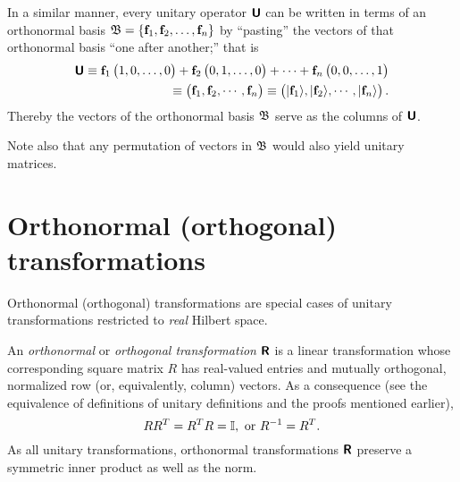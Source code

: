 In a similar manner, every unitary operator  $\textsf{\textbf{U}}$  can be written in terms of an orthonormal basis
${\frak B}=\{{\bf f}_1,  {\bf f}_2, \ldots , {\bf f}_n\}$
by ``pasting'' the  vectors of that orthonormal basis ``one after another;''
that is
\begin{equation}
\begin{split}
\textsf{\textbf{U}}
\equiv
{\bf f}_1 \begin{pmatrix} 1,0,\ldots ,0\end{pmatrix} +
{\bf f}_2 \begin{pmatrix} 0,1,\ldots ,0\end{pmatrix} +
\cdots +
{\bf f}_n \begin{pmatrix} 0,0,\ldots ,1\end{pmatrix}   \\
\equiv
\begin{pmatrix}
{\bf f}_1,
{\bf f}_2,
\cdots,
{\bf f}_n
\end{pmatrix}
\equiv
\begin{pmatrix}
\vert {\bf f}_1 \rangle ,
\vert {\bf f}_2 \rangle ,
\cdots,
\vert {\bf f}_n \rangle
\end{pmatrix}
.
\end{split}
\label{2015-m-ch-fdlvs-uniascolv}
\end{equation}
Thereby the vectors of the orthonormal basis  ${\frak B}$ serve as the
columns of $\textsf{\textbf{U}}$.

Note also that any permutation of vectors in ${\frak B}$ would also yield unitary matrices.


\section{Orthonormal (orthogonal) transformations}
\label{2015-m-ch-fdlvs-orthproj}

Orthonormal (orthogonal) transformations are special cases of unitary transformations restricted to {\em real} Hilbert space.

An {\em orthonormal} or {\em orthogonal transformation} $\textsf{\textbf{R}}$ is a linear transformation
whose corresponding square matrix $R$ has real-valued entries
and mutually orthogonal, normalized row (or, equivalently, column) vectors.
As a consequence (see the equivalence of definitions of unitary definitions and the proofs mentioned earlier),
\begin{equation}
RR^T= R^TR= {\Bbb I}, \textrm{ or } R^{-1}=R^T .
\end{equation}
As all unitary transformations, orthonormal transformations $\textsf{\textbf{R}}$
preserve a symmetric inner product as well as the norm.

